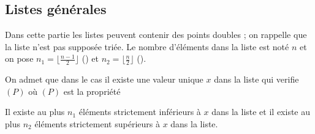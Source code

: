 \subsection{Listes générales} 
Dans cette partie les listes peuvent contenir des points doubles ; on rappelle que la liste n'est pas supposée triée.
Le nombre d'éléments dans la liste est noté $n$ et on pose $n_1 = \lfloor \frac {n-1} 2 \rfloor$ () et $n_2 = \lfloor \frac n 2 \rfloor$  ().

On admet que dans le cas il existe une valeur unique $x$ dans la liste qui verifie $(P)$ où $(P)$ est la propriété 

Il existe au plus $n_1$ éléments strictement inférieurs à $x$ dans la liste 
et il existe au plus $n_2$ éléments strictement supérieurs à $x$ dans la liste. 

